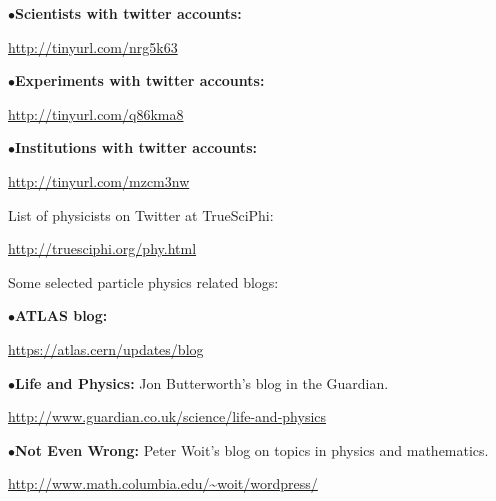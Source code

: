 \vfil\eject

\item{$\bullet$}{\bf Scientists with twitter accounts:}
	\item{}\qquad\url{http://tinyurl.com/nrg5k63}

\item{$\bullet$}{\bf Experiments with twitter accounts:}
	\item{}\qquad\url{http://tinyurl.com/q86kma8}

\item{$\bullet$}{\bf Institutions with twitter accounts:}
	\item{}\qquad\url{http://tinyurl.com/mzcm3nw}

\medskip

List of physicists on Twitter at TrueSciPhi:

	\item{}\qquad\url{http://truesciphi.org/phy.html}

\medskip

Some selected particle physics related blogs:

\medskip

\item{$\bullet$}{\bf ATLAS blog:}
	\item{}\qquad\url{https://atlas.cern/updates/blog}





\medskip

\item{$\bullet$}{\bf Life and Physics:}
Jon Butterworth's blog in the Guardian.
	\item{}\qquad\url{http://www.guardian.co.uk/science/life-and-physics}

\medskip

\item{$\bullet$}{\bf Not Even Wrong:}
Peter Woit's blog on topics in physics and mathematics.
	\item{}\qquad\url{http://www.math.columbia.edu/~woit/wordpress/}

